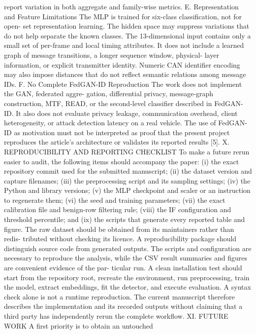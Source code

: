 \documentclass[
]{article}
\begin{document}
report variation in both aggregate and family-wise metrics. E.
Representation and Feature Limitations The MLP is trained for six-class
classification, not for open- set representation learning. The hidden
space may suppress variations that do not help separate the known
classes. The 13-dimensional input contains only a small set of per-frame
and local timing attributes. It does not include a learned graph of
message transitions, a longer sequence window, physical- layer
information, or explicit transmitter identity. Numeric CAN identifier
encoding may also impose distances that do not reflect semantic
relations among message IDs. F. No Complete FedGAN-ID Reproduction The
work does not implement the GAN, federated aggre- gation, differential
privacy, message-graph construction, MTF, READ, or the second-level
classifier described in FedGAN- ID. It also does not evaluate privacy
leakage, communication overhead, client heterogeneity, or attack
detection latency on a real vehicle. The use of FedGAN-ID as motivation
must not be interpreted as proof that the present project reproduces the
article's architecture or validates its reported results {[}5{]}. X.
REPRODUCIBILITY AND REPORTING CHECKLIST To make a future rerun easier to
audit, the following items should accompany the paper: (i) the exact
repository commit used for the submitted manuscript; (ii) the dataset
version and capture filenames; (iii) the preprocessing script and its
sampling settings; (iv) the Python and library versions; (v) the MLP
checkpoint and scaler or an instruction to regenerate them; (vi) the
seed and training parameters; (vii) the exact calibration file and
benign-row filtering rule; (viii) the IF configuration and threshold
percentile; and (ix) the scripts that generate every reported table and
figure. The raw dataset should be obtained from its maintainers rather
than redis- tributed without checking its licence. A reproducibility
package should distinguish source code from generated outputs. The
scripts and configuration are necessary to reproduce the analysis, while
the CSV result summaries and figures are convenient evidence of the par-
ticular run. A clean installation test should start from the repository
root, recreate the environment, run preprocessing, train the model,
extract embeddings, fit the detector, and execute evaluation. A syntax
check alone is not a runtime reproduction. The current manuscript
therefore describes the implementation and its recorded outputs without
claiming that a third party has independently rerun the complete
workflow. XI. FUTURE WORK A first priority is to obtain an untouched
\end{document}
